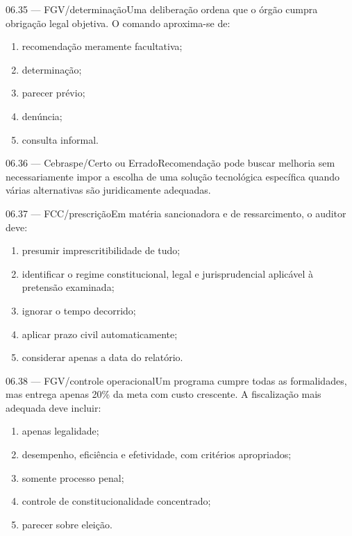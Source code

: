 \begin{questao}{ 06.35 — FGV/determinação}Uma deliberação ordena que o órgão cumpra obrigação legal objetiva. O comando aproxima-se de:\begin{enumerate}[label=\Alph*)]\item recomendação meramente facultativa;\item determinação;\item parecer prévio;\item denúncia;\item consulta informal.\end{enumerate}\end{questao}
\begin{questao}{ 06.36 — Cebraspe/Certo ou Errado}Recomendação pode buscar melhoria sem necessariamente impor a escolha de uma solução tecnológica específica quando várias alternativas são juridicamente adequadas.\end{questao}
\begin{questao}{ 06.37 — FCC/prescrição}Em matéria sancionadora e de ressarcimento, o auditor deve:\begin{enumerate}[label=\Alph*)]\item presumir imprescritibilidade de tudo;\item identificar o regime constitucional, legal e jurisprudencial aplicável à pretensão examinada;\item ignorar o tempo decorrido;\item aplicar prazo civil automaticamente;\item considerar apenas a data do relatório.\end{enumerate}\end{questao}
\begin{questao}{ 06.38 — FGV/controle operacional}Um programa cumpre todas as formalidades, mas entrega apenas 20\% da meta com custo crescente. A fiscalização mais adequada deve incluir:\begin{enumerate}[label=\Alph*)]\item apenas legalidade;\item desempenho, eficiência e efetividade, com critérios apropriados;\item somente processo penal;\item controle de constitucionalidade concentrado;\item parecer sobre eleição.\end{enumerate}\end{questao}
